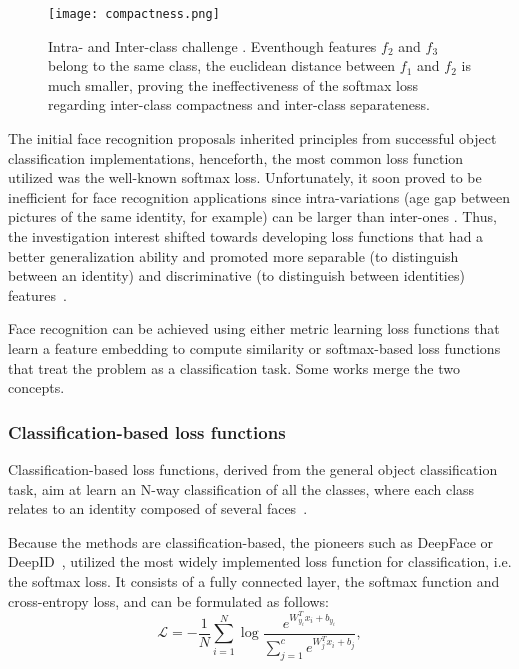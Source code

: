 \documentclass[class=report, crop=false, a4paper, 12pt]{standalone}
\begin{document}
\begin{figure}[!h]
    \centering
    \texttt{[image: compactness.png]}
    \caption[Intra- and Inter-class challenge.]{Intra- and Inter-class challenge \autocite{wangNormFaceL2Hypersphere2017}. Eventhough features $f_2$ and $f_3$ belong to the same class, the euclidean distance between $f_1$ and $f_2$ is much smaller, proving the ineffectiveness of the softmax loss regarding inter-class compactness and inter-class separateness.}
    \label{fig:compactness}
\end{figure}

The initial face recognition proposals inherited principles from successful object classification implementations, henceforth, the most common loss function utilized was the well-known softmax loss. Unfortunately, it soon proved to be inefficient for face recognition applications since intra-variations (age gap between pictures of the same identity, for example) can be larger than inter-ones . Thus, the investigation interest shifted towards developing loss functions that had a better generalization ability and promoted more separable (to distinguish between an identity) and discriminative (to distinguish between identities) features~\autocite{wangDeepFaceRecognition2021}.
\par Face recognition can be achieved using either metric learning loss functions that learn a feature embedding to compute similarity or softmax-based loss functions that treat the problem as a classification task. Some works merge the two concepts.

\subsubsection{Classification-based loss functions}
Classification-based loss functions, derived from the general object classification task, aim at learn an N-way classification of all the classes, where each class relates to an identity composed of several faces~\autocite{duElementsEndtoendDeep2022}.
\par Because the methods are classification-based, the pioneers such as DeepFace or DeepID~\autocite{sunDeepLearningFace2014a}, utilized the most widely implemented loss function for classification, i.e. the softmax loss. It consists of a fully connected layer, the softmax function and cross-entropy loss, and can be formulated as follows:
\begin{equation}
\mathcal{L} = -\frac{1}{N}\sum_{i=1}^{N}\log{\frac{e^{W_{y_i}^{T}x_i+b_{y_i}}}{\sum_{j=1}^{c}e^{W_{j}^{T}x_i+b_{j}}}},
\end{equation}
\end{document}
